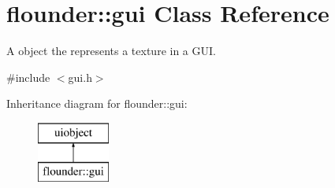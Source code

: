 \hypertarget{classflounder_1_1gui}{}\section{flounder\+:\+:gui Class Reference}
\label{classflounder_1_1gui}


A object the represents a texture in a G\+UI.  




{\ttfamily \#include $<$gui.\+h$>$}

Inheritance diagram for flounder\+:\+:gui\+:\begin{figure}[H]
\begin{center}
\leavevmode
\includegraphics[height=2.000000cm]{classflounder_1_1gui}
\end{center}
\end{figure}
